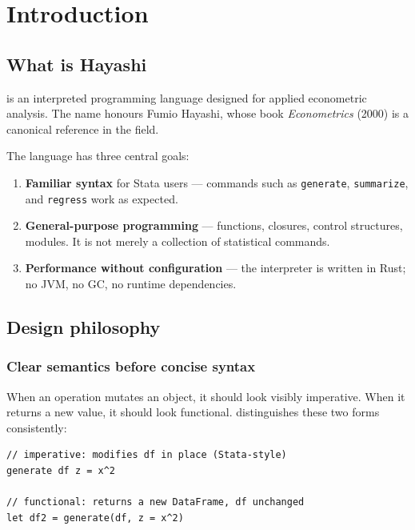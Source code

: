 \chapter{Introduction}

\section{What is Hayashi}

\hayashi{} is an interpreted programming language designed for applied
econometric analysis. The name honours Fumio Hayashi, whose book
\textit{Econometrics} (2000) is a canonical reference in the field.

The language has three central goals:

\begin{enumerate}
  \item \textbf{Familiar syntax} for Stata users — commands such as
        \lstinline{generate}, \lstinline{summarize}, and \lstinline{regress}
        work as expected.
  \item \textbf{General-purpose programming} — functions, closures, control
        structures, modules. It is not merely a collection of statistical
        commands.
  \item \textbf{Performance without configuration} — the interpreter is
        written in Rust; no JVM, no GC, no runtime dependencies.
\end{enumerate}

\section{Design philosophy}

\subsection*{Clear semantics before concise syntax}

When an operation mutates an object, it should look visibly imperative.
When it returns a new value, it should look functional. \hayashi{}
distinguishes these two forms consistently:

\begin{lstlisting}[caption={Imperative form vs.\ functional form}]
// imperative: modifies df in place (Stata-style)
generate df z = x^2

// functional: returns a new DataFrame, df unchanged
let df2 = generate(df, z = x^2)
\end{lstlisting}

